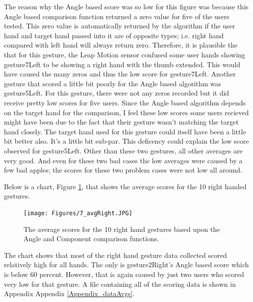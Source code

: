The reason why the Angle based score was so low for this figure was because this Angle based comparison function returned a zero value for five of the users tested. This zero value is automatically returned by the algorithm if the user hand and target hand passed into it are of opposite types; i.e. right hand compared with left hand will always return zero. Therefore, it is plausible the that for this gesture, the Leap Motion sensor confused some user hands showing gesture7Left to be showing a right hand with the thumb extended. This would have caused the many zeros and thus the low score for gesture7Left. Another gesture that scored a little bit poorly for the Angle based algorithm was gesture5Left. For this gesture, there were not any zeros recorded but it did receive pretty low scores for five users. Since the Angle based algorithm depends on the target hand for the comparison, I feel these low scores some users recieved might have been due to the fact that their gesture wasn't matching the target hand closely. The target hand used for this gesture could itself have been a little bit better also. It's a little bit sub-par. This deficency could explain the low score observed for gesture5Left. Other than these two gestures, all other averages are very good. And even for these two bad cases the low averages were caused by a few bad apples; the scores for these two problem cases were not low all around. 

Below is a chart, Figure \ref{fig:rightAvgs}, that shows the average scores for the 10 right handed gestures.
\begin{figure}[H]
\centering
\texttt{[image: Figures/7\_avgRight.JPG]}
\caption[Averages for Right Hand Gestures]{The average scores for the 10 right hand gestures based upon the Angle and Component comparison functions.}
\label{fig:rightAvgs}
\end{figure}
The chart shows that most of the right hand gesture data collected scored relatively high for all hands. The only is gesture2Right's Angle based score which is below 60 percent. However, that is again caused by just two users who scored very low for that gesture. A file containing all of the scoring data is shown in Appendix  Appendix \ref{Appendix_dataAvgs}. 


